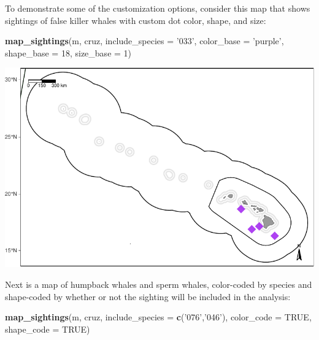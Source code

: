 \documentclass[
]{book}
\newenvironment{Shaded}{\begin{snugshade}}{\end{snugshade}}
\newcommand{\DataTypeTok}[1]{\textcolor[rgb]{0.13,0.29,0.53}{#1}}
\newcommand{\DecValTok}[1]{\textcolor[rgb]{0.00,0.00,0.81}{#1}}
\newcommand{\KeywordTok}[1]{\textcolor[rgb]{0.13,0.29,0.53}{\textbf{#1}}}
\newcommand{\NormalTok}[1]{#1}
\newcommand{\OtherTok}[1]{\textcolor[rgb]{0.56,0.35,0.01}{#1}}
\newcommand{\StringTok}[1]{\textcolor[rgb]{0.31,0.60,0.02}{#1}}
\begin{document}
To demonstrate some of the customization options, consider this map that shows sightings of false killer whales with custom dot color, shape, and size:

\begin{Shaded}
\begin{Highlighting}[]
\KeywordTok{map_sightings}\NormalTok{(m,}
\NormalTok{              cruz,}
              \DataTypeTok{include_species =} \StringTok{'033'}\NormalTok{,}
              \DataTypeTok{color_base =} \StringTok{'purple'}\NormalTok{,}
              \DataTypeTok{shape_base =} \DecValTok{18}\NormalTok{,}
              \DataTypeTok{size_base =} \DecValTok{1}\NormalTok{)}
\end{Highlighting}
\end{Shaded}

\includegraphics{figures/unnamed-chunk-58-1.pdf}

Next is a map of humpback whales and sperm whales, color-coded by species and shape-coded by whether or not the sighting will be included in the analysis:

\begin{Shaded}
\begin{Highlighting}[]
\KeywordTok{map_sightings}\NormalTok{(m, }
\NormalTok{              cruz,}
              \DataTypeTok{include_species =} \KeywordTok{c}\NormalTok{(}\StringTok{'076'}\NormalTok{,}\StringTok{'046'}\NormalTok{),}
              \DataTypeTok{color_code =} \OtherTok{TRUE}\NormalTok{,}
              \DataTypeTok{shape_code =} \OtherTok{TRUE}\NormalTok{)}
\end{Highlighting}
\end{Shaded}
\end{document}
